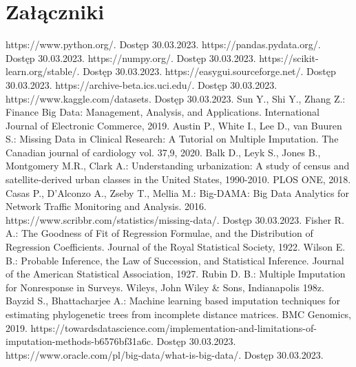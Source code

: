 \documentclass[12pt,twoside]{article}
\begin{document}
\clearpage
\section*{Załączniki}


\clearpage



\begin{thebibliography}{4}
     https://www.python.org/. Dostęp 30.03.2023.
     https://pandas.pydata.org/. Dostęp 30.03.2023.
     https://numpy.org/. Dostęp 30.03.2023.
     https://scikit-learn.org/stable/. Dostęp 30.03.2023.
     https://easygui.sourceforge.net/. Dostęp 30.03.2023.
     https://archive-beta.ics.uci.edu/. Dostęp 30.03.2023.
     https://www.kaggle.com/datasets. Dostęp 30.03.2023.
     Sun Y., Shi Y., Zhang Z.: Finance Big Data: Management, Analysis, and Applications. International Journal of Electronic Commerce, 2019.
     Austin P., White I., Lee D., van Buuren S.: Missing Data in Clinical Research: A Tutorial on Multiple Imputation. The Canadian journal of cardiology vol. 37,9, 2020.
     Balk D., Leyk S., Jones B., Montgomery M.R., Clark A.: Understanding urbanization: A study of census and satellite-derived urban classes in the United States, 1990-2010. PLOS ONE, 2018.
     Casas P., D'Alconzo A., Zseby T., Mellia M.: Big-DAMA: Big Data Analytics for Network Traffic Monitoring and Analysis. 2016.
     https://www.scribbr.com/statistics/missing-data/. Dostęp 30.03.2023.
     Fisher R. A.: The Goodness of Fit of Regression Formulae, and the Distribution of Regression Coefficients. Journal of the Royal Statistical Society, 1922.
     Wilson E. B.: Probable Inference, the Law of Succession, and Statistical Inference. Journal of the American Statistical Association, 1927.
     Rubin D. B.: Multiple Imputation for Nonresponse in Surveys. Wileys, John Wiley \& Sons, Indianapolis 198z.
     Bayzid S., Bhattacharjee A.: Machine learning based imputation techniques for estimating phylogenetic trees from incomplete distance matrices. BMC Genomics, 2019.
     https://towardsdatascience.com/implementation-and-limitations-of-imputation-methods-b6576bf31a6c. Dostęp 30.03.2023.
     https://www.oracle.com/pl/big-data/what-is-big-data/. Dostęp 30.03.2023.

\end{thebibliography}
\end{document}
